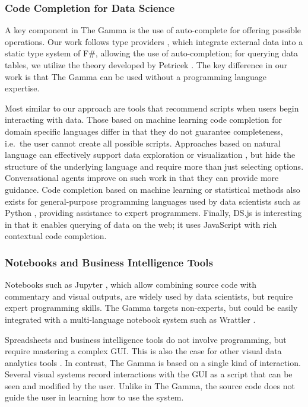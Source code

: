 \documentclass[manuscript,review,anonymous]{acmart}
\begin{document}
\subsubsection*{Code Completion for Data Science}

A key component in The Gamma is the use of auto-complete for offering possible operations.
Our work follows type providers \cite{inforich,fsdata}, which integrate external data into a
static type system of F\#, allowing the use of auto-completion; for querying data tables, we utilize
the theory developed by Petricek \cite{dotdriven}. The key difference in our work is that The Gamma
can be used without a programming language expertise.

Most similar to our approach are tools that recommend scripts when users begin interacting
with data. Those based on machine learning code completion for domain specific languages \cite{predictive,proactive}
differ in that they do not guarantee completeness, i.e.~the user cannot create all possible
scripts. Approaches based on natural language can effectively support data exploration
or visualization \cite{eviza,codemend}, but hide the structure of the underlying language and
require more than just selecting options. Conversational agents \cite{iris} improve on such work
in that they can provide more guidance. Code completion based on machine learning or statistical
methods \cite{mlcomplete,statcomplete} also exists for general-purpose programming languages used
by data scientists such as Python \cite{pythia}, providing assistance to expert programmers.
Finally, DS.js \cite{dsjs} is interesting in that it enables querying of data on the
web; it uses JavaScript with rich contextual code completion.

\subsubsection*{Notebooks and Business Intelligence Tools}

Notebooks such as Jupyter \cite{jupyter}, which allow combining source code with commentary and
visual outputs, are widely used by data scientists, but require expert programming skills.
The Gamma targets non-experts, but could be easily integrated with a multi-language notebook system
such as Wrattler \cite{wrattler}.

Spreadsheets and business intelligence tools \cite{tableau,powerbi} do
not involve programming, but require mastering a complex GUI. This is also the case
for other visual data analytics tools \cite{control,vizdom}. In contrast, The Gamma is
based on a single kind of interaction. Several visual systems \cite{potter,wrangler,lyra} record
interactions with the GUI as a script that can be seen and modified by the user.
Unlike in The Gamma, the source code does not guide the user in learning how to use the system.
\end{document}
